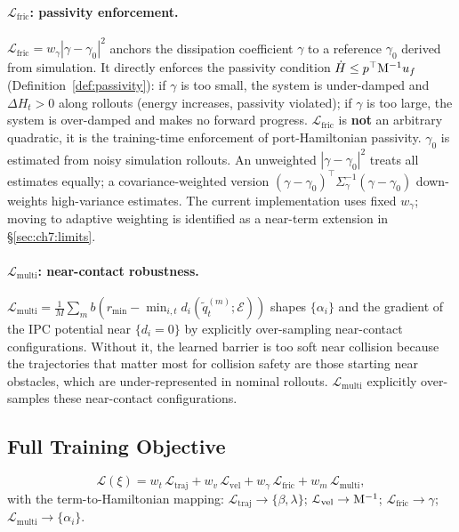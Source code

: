 \paragraph{$\mathcal{L}_{\mathrm{fric}}$: passivity enforcement.}
$\mathcal{L}_{\mathrm{fric}} = w_\gamma|\gamma - \gamma_0|^2$
anchors the dissipation coefficient $\gamma$ to a reference $\gamma_0$ derived from simulation.
It directly enforces the passivity condition
$\dot{H} \leq p^\top\mathrm{M}^{-1} u_f$
(Definition~\ref{def:passivity}): if $\gamma$ is too small,
the system is under-damped and $\Delta H_t > 0$ along rollouts
(energy increases, passivity violated); if $\gamma$ is too large,
the system is over-damped and makes no forward progress.
$\mathcal{L}_{\mathrm{fric}}$ is \textbf{not} an arbitrary quadratic,
it is the training-time enforcement of port-Hamiltonian passivity.
$\gamma_0$ is estimated from noisy simulation rollouts.
An unweighted $|\gamma - \gamma_0|^2$ treats all estimates equally;
a covariance-weighted version $(\gamma - \gamma_0)^\top\Sigma_\gamma^{-1}(\gamma-\gamma_0)$
down-weights high-variance estimates.
The current implementation uses fixed $w_\gamma$; moving to adaptive
weighting is identified as a near-term extension in §\ref{sec:ch7:limits}.

\paragraph{$\mathcal{L}_{\mathrm{multi}}$: near-contact robustness.}
$\mathcal{L}_{\mathrm{multi}} = \frac{1}{M}\sum_m b(r_{\min} - \min_{i,t}d_i(\tilde{q}_t^{(m)};\mathcal{E}))$
shapes $\{\alpha_i\}$ and the
gradient of the IPC potential near $\{d_i = 0\}$ by explicitly over-sampling near-contact
configurations.
Without it, the learned barrier is too soft near collision because
the trajectories that matter most for collision safety are those
starting near obstacles, which are under-represented in
nominal rollouts.
$\mathcal{L}_{\mathrm{multi}}$ explicitly over-samples these
near-contact configurations.

\subsection{Full Training Objective}
\label{subsec:ch3:full_loss}

\begin{equation}
  \mathcal{L}(\xi)
  = w_t\,\mathcal{L}_{\mathrm{traj}}
  + w_v\,\mathcal{L}_{\mathrm{vel}}
  + w_\gamma\,\mathcal{L}_{\mathrm{fric}}
  + w_m\,\mathcal{L}_{\mathrm{multi}},
  \label{eq:ch3:full_loss}
\end{equation}
with the term-to-Hamiltonian mapping:
$\mathcal{L}_{\mathrm{traj}} \to \{\beta,\lambda\}$;\;
$\mathcal{L}_{\mathrm{vel}} \to \mathrm{M}^{-1}$;\;
$\mathcal{L}_{\mathrm{fric}} \to \gamma$;\;
$\mathcal{L}_{\mathrm{multi}} \to \{\alpha_i\}$.

